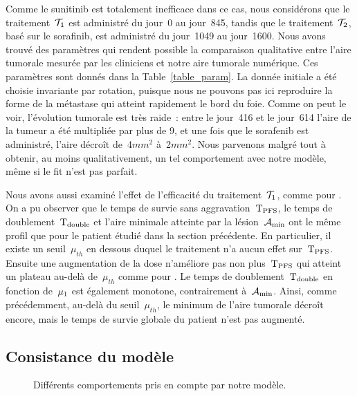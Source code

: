 \documentclass[main.tex]{subfiles}
\begin{document}
Comme le sunitinib est totalement inefficace dans ce cas, nous considérons que le 
traitement~${\mathcal T_1}$ est administré du jour~0 au jour~845, tandis que le 
traitement~${\mathcal T_2}$, basé sur le sorafinib, est administré du jour~1049 au jour~1600. 
Nous avons trouvé des paramètres qui rendent possible la comparaison qualitative entre l'aire tumorale mesurée par les cliniciens et notre aire tumorale numérique. Ces paramètres sont donnés dans la  Table~\ref{table_param}. 
La donnée initiale a été choisie invariante par rotation, puisque nous ne pouvons pas %
ici reproduire la forme de la métastase qui atteint rapidement le bord du foie.
Comme on peut le voir, l'évolution tumorale est très raide~: entre le  jour~416 et le jour~614 l'aire de la tumeur a été multipliée par plus de 9, et une fois que le sorafenib est administré, l'aire décroît de~4\;$mm^2$ à~2\;$mm^2$. Nous parvenons malgré tout à obtenir, au moins qualitativement, un tel comportement avec notre modèle, même si le fit n'est pas parfait. 


Nous avons aussi examiné l'effet de l'efficacité du traitement~$\mathcal{T}_1$, comme pour \Nber. 
On a pu observer que le temps de survie sans aggravation~${\rm T_{PFS}}$, le temps de doublement~${\rm T_{double}}$ et l'aire minimale atteinte par la  lésion~$\mathcal{A}_{\rm min}$ ont le même profil que pour le patient étudié dans la section précédente. En particulier, il existe un seuil~$\mu_{th}$ en dessous duquel le  traitement n'a aucun effet sur~${\rm T_{PFS}}$. Ensuite une augmentation de la dose n'améliore pas non plus~${\rm T_{PFS}}$ qui atteint un plateau au-delà de~$\mu_{th}$ comme pour \Nber. 
Le temps de doublement~${\rm T_{double}}$ en fonction de~$\mu_1$ est également monotone, contrairement à~$\mathcal{A}_{\rm min}$. Ainsi, comme précédemment, au-delà du seuil~$\mu_{th}$, le minimum de l'aire tumorale décroît encore, mais le temps de survie globale du patient n'est pas augmenté.



\subsection{Consistance du modèle\label{section_possibilites}}
\begin{figure}[h]
\vspace{-1cm}
\centering \hfill
\captionsetup[subfigure]{margin=10pt}
\renewcommand{\thesubfigure}{b-c-d}
\renewcommand{\thesubfigure}{e-f-g}
\caption{\label{fig:possibilites}Différents comportements pris en compte par notre modèle.}
\vspace{-1cm}
\end{figure}
\end{document}

